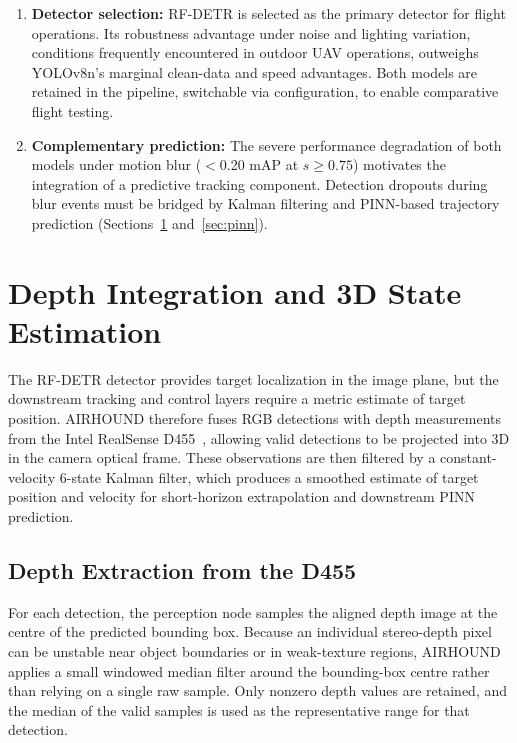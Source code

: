 \documentclass[11pt,letterpaper]{article}
\begin{document}
\begin{enumerate}
    \item \textbf{Detector selection:} RF-DETR is selected as the primary detector for flight operations. Its robustness advantage under noise and lighting variation, conditions frequently encountered in outdoor UAV operations, outweighs YOLOv8n's marginal clean-data and speed advantages. Both models are retained in the pipeline, switchable via configuration, to enable comparative flight testing.

    \item \textbf{Complementary prediction:} The severe performance degradation of both models under motion blur ($<$0.20 mAP at $s \geq 0.75$) motivates the integration of a predictive tracking component. Detection dropouts during blur events must be bridged by Kalman filtering and PINN-based trajectory prediction (Sections~\ref{sec:depth} and~\ref{sec:pinn}).
\end{enumerate}

\section{Depth Integration and 3D State Estimation}
\label{sec:depth}

The RF-DETR detector provides target localization in the image plane, but the downstream tracking and control layers require a metric estimate of target position. AIRHOUND therefore fuses RGB detections with depth measurements from the Intel RealSense D455~\cite{realsensed455}, allowing valid detections to be projected into 3D in the camera optical frame. These observations are then filtered by a constant-velocity 6-state Kalman filter, which produces a smoothed estimate of target position and velocity for short-horizon extrapolation and downstream PINN prediction.

\subsection{Depth Extraction from the D455}
\label{sec:depth_extraction}

For each detection, the perception node samples the aligned depth image at the centre of the predicted bounding box. Because an individual stereo-depth pixel can be unstable near object boundaries or in weak-texture regions, AIRHOUND applies a small windowed median filter around the bounding-box centre rather than relying on a single raw sample. Only nonzero depth values are retained, and the median of the valid samples is used as the representative range for that detection.
\end{document}
